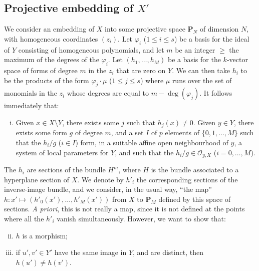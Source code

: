 \documentclass{article}
\theoremstyle{plain}
\theoremstyle{definition}
\newcommand{\sh}[1]{{\mathscr{#1}}}
\newcommand{\PP}{\mathbf{P}}
\renewcommand{\geq}{\geqslant}
\renewcommand{\leq}{\leqslant}
\begin{document}
\subsection{Projective embedding of \texorpdfstring{$X'$}{X'}}
\label{subsection12c}

We consider an embedding of $X$ into some projective space $\PP_N$ of dimension $N$, with homogeneous coordinates $(z_i)$.
Let $\varphi_i$ ($1\leq i\leq s$) be a basis for the ideal of $Y$ consisting of homogeneous polynomials, and let $m$ be an integer $\geq$ the maximum of the degrees of the $\varphi_i$.
Let $(h_1,\ldots,h_M)$ be a basis for the $k$-vector space of forms of degree $m$ in the $z_i$ that are zero on $Y$.
We can then take $h_i$ to be the products of the form $\varphi_j\cdot\mu$ ($1\leq j\leq s$) where $\mu$ runs over the set of monomials in the $z_i$ whose degrees are equal to $m-\deg(\varphi_j)$.
It follows immediately that:
\begin{enumerate}[(i)]
  \item Given $x\in X\setminus Y$, there exists some $j$ such that $h_j(x)\neq0$.
    Given $y\in Y$, there exists some form $g$ of degree $m$, and a set $I$ of $p$ elements of $\{0,1,\ldots,M\}$ such that the $h_i/g$ ($i\in I$) form, in a suitable affine open neighbourhood of $y$, a system of local parameters for $Y$, and such that the $h_i/g\in\sh{O}_{y,X}$ ($i=0,\ldots,M$).
\end{enumerate}

The $h_i$ are  sections of the bundle $H^m$, where $H$ is the bundle associated to a hyperplane section of $X$.
We denote by $h'_i$ the corresponding sections of the inverse-image bundle, and we consider, in the usual way, ``the map'' $h\colon x'\mapsto(h'_0(x'),\ldots,h'_M(x'))$ from $X$ to $\PP_M$ defined by this space of sections.
\emph{A priori}, this is not really a map, since it is not defined at the points where all the $h'_i$ vanish simultaneously.
However, we want to show that:

\begin{enumerate}[(i)]
  \setcounter{enumi}{1}
  \item $h$ is a morphism;
  \item if $u',v'\in Y'$ have the same image in $Y$, and are distinct, then $h(u')\neq h(v')$.
\end{enumerate}
\end{document}
